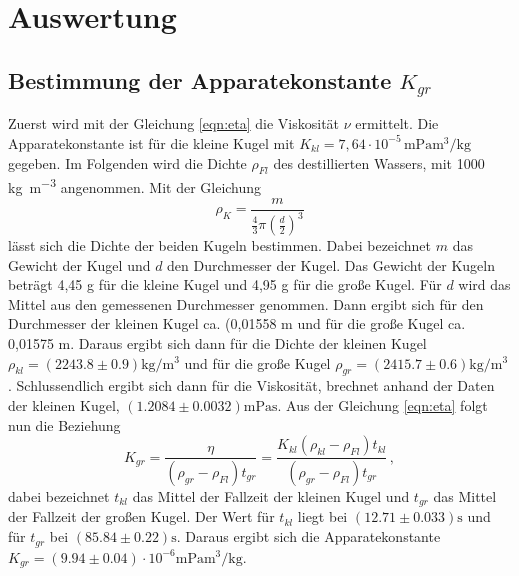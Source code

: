 \section{Auswertung}
\label{sec:Auswertung}
\subsection{Bestimmung der Apparatekonstante \texorpdfstring{$K_{gr}$}{math}}
\label{sec:BdA}
Zuerst wird mit der Gleichung \eqref{eqn:eta}
die Viskosität $\nu$ ermittelt.
Die Apparatekonstante ist für die kleine Kugel mit $K_{kl} = 7,64 \cdot 10^{-5}
\,\si{\milli\pascal\meter\tothe{3}\per\kilo\gram} $
gegeben. Im Folgenden wird die Dichte $\rho_{Fl}$ des destillierten Wassers, mit
1000 \si{\kilo\gram\per\meter\tothe{3}} angenommen. Mit der Gleichung
\begin{equation*}
  \rho_{K} = \frac{m}{\frac{4}{3}\pi\left(\frac{d}{2}\right)^3}
\end{equation*}
lässt sich die Dichte der beiden Kugeln bestimmen. Dabei bezeichnet $m$ das
Gewicht der Kugel und $d$ den Durchmesser der Kugel. Das Gewicht der Kugeln
beträgt 4,45 \si{\gram} für die kleine Kugel und 4,95 \si{\gram} für die große
Kugel. Für $d$ wird das Mittel aus den gemessenen Durchmesser genommen. Dann
ergibt sich für den Durchmesser der kleinen Kugel ca. (0,01558 \si{\meter} und
für die große Kugel ca. 0,01575 \si{\meter}.
Daraus ergibt sich dann für die Dichte der kleinen Kugel $\rho_{kl} =
(2243.8 \pm 0.9) \si{\kilo\gram\per\meter\tothe{3}}$ und für die große Kugel
$\rho_{gr} = (2415.7 \pm 0.6) \si{\kilo\gram\per\meter\tothe{3}} $.
Schlussendlich ergibt sich dann
für die Viskosität, brechnet anhand der Daten der kleinen Kugel,
$(1.2084 \pm 0.0032)\si{\milli\pascal\second}$.
Aus der Gleichung \eqref{eqn:eta} folgt nun die Beziehung
\begin{equation*}
  K_{gr} = \frac{\eta}{(\rho_{gr} - \rho_{Fl})t_{gr}}
        = \frac{K_{kl} (\rho_{kl} - \rho_{Fl})t_{kl}}{(\rho_{gr} - \rho_{Fl})t_{gr}}\, ,
\end{equation*}
dabei bezeichnet $t_{kl}$ das Mittel der Fallzeit der kleinen Kugel und $t_{gr}$
das Mittel der Fallzeit der großen Kugel. Der Wert für $t_{kl}$ liegt bei
$(12.71 \pm 0.033) \si{\second}$ und für $t_{gr}$ bei $(85.84 \pm 0.22)
\si{\second}$. Daraus ergibt sich die Apparatekonstante $K_{gr}  = (9.94 \pm 0.04)
\cdot 10^{-6} \si{\milli\pascal\meter\tothe{3}\per\kilo\gram}$.
